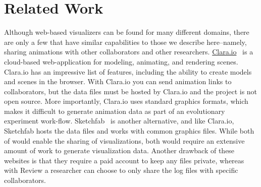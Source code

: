 \section{Related Work}
\label{sec:related_work}

Although web-based visualizers can be found for many different domains, there are only a few that have similar capabilities to those we describe here--namely, sharing animations with other collaborators and other researchers.
%
\url{Clara.io}~\autocite{Clara.2018.SIGGRAPH.Web} is a cloud-based web-application for modeling, animating, and rendering scenes.
%
Clara.io has an impressive list of features, including the ability to create models and scenes in the browser. With Clara.io you can send animation links to collaborators, but the data files must be hosted by Clara.io and the project is not open source.
%
More importantly, Clara.io uses standard graphics formats, which makes it difficult to generate animation data as part of an evolutionary experiment work-flow.
%
Sketchfab~\autocite{Sketchfab.2018.Web} is another alternative, and like Clara.io, Sketchfab hosts the data files and works with common graphics files.
%
While both of would enable the sharing of visualizations, both would require an extensive amount of work to generate visualization data.
%
Another drawback of these websites is that they require a paid account to keep any files private, whereas with Review a researcher can choose to only share the log files with specific collaborators.
